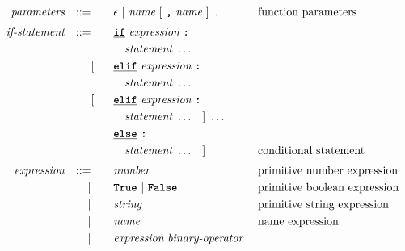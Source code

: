 \begin{alignat*}{9}
&& \textit{parameters}   && ::= &\quad &&  \epsilon\ | \  \textit{name} \ 
                                                   [\ \textbf{\texttt{,}} \ \textit{name}\ ]\ \ldots
                                                            && \textrm{function parameters}   \\[1mm]
&& \textit{if-statement} && ::= &\quad &&  \textbf{\texttt{\underline{if}}}\ \textit{expression} \ 
                                           \textbf{\texttt{:}}  \\
&&                       &&     &\quad && \quad \textit{statement} \ \ldots \quad
                                                           &&  \\  
&&                       &&     &      [&& \textbf{\texttt{\underline{elif}}} \ \textit{expression} \
                                          \textbf{\texttt{:}} \\ 
&&                       &&     &\quad && \quad \textit{statement} \ \ldots \quad
                                                           &&  \\
&&                       &&     &      [&& \textbf{\texttt{\underline{elif}}} \ \textit{expression} \
                                          \textbf{\texttt{:}} \\ 
&&                       &&     &\quad && \quad \textit{statement} \ \ldots \quad ] \ \ldots \quad 
                                                           &&  \\     
&&                       &&     &      && \textbf{\texttt{\underline{else}}}\
                                          \textbf{\texttt{:}} \\
&&                       &&     &\quad && \quad \textit{statement} \ \ldots \quad ]
                                                           && \textrm{conditional statement}  \\[1mm]
&& \textit{expression}   && ::= &\quad &&  \textit{number}   && \textrm{primitive number expression}\\
&&                       && |   &\quad && \textbf{\texttt{True}}\ |\ \textbf{\texttt{False}}
                                                           && \textrm{primitive boolean expression}\\
&&                       && |   &\quad &&  \textit{string}   && \textrm{primitive string expression}\\
&&                       && |   &\quad &&  \textit{name}   && \textrm{name expression}\\
&&                       && |   &\quad &&  \textit{expression} \  \textit{binary-operator} \ 

\end{alignat*}
